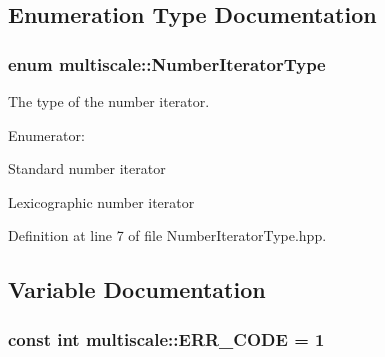 \subsection{\-Enumeration \-Type \-Documentation}
\hypertarget{namespacemultiscale_a6ef911f4d48a4bf5e657c237ec169ff5}{
\subsubsection[{\-Number\-Iterator\-Type}]{\setlength{\rightskip}{0pt plus 5cm}enum {\bf multiscale\-::\-Number\-Iterator\-Type}}}\label{namespacemultiscale_a6ef911f4d48a4bf5e657c237ec169ff5}


\-The type of the number iterator. 

\begin{Desc}
\item[\-Enumerator\-: ]\par
\begin{description}
\item[{\em 
\hypertarget{namespacemultiscale_a6ef911f4d48a4bf5e657c237ec169ff5aa048887eb0360a4b70dff5452133f42e}{\-S\-T\-A\-N\-D\-A\-R\-D}\label{namespacemultiscale_a6ef911f4d48a4bf5e657c237ec169ff5aa048887eb0360a4b70dff5452133f42e}
}]\-Standard number iterator \item[{\em 
\hypertarget{namespacemultiscale_a6ef911f4d48a4bf5e657c237ec169ff5a2cba3a0174cc5c1d555ee13dcf6cda15}{\-L\-E\-X\-I\-C\-O\-G\-R\-A\-P\-H\-I\-C}\label{namespacemultiscale_a6ef911f4d48a4bf5e657c237ec169ff5a2cba3a0174cc5c1d555ee13dcf6cda15}
}]\-Lexicographic number iterator \end{description}
\end{Desc}



\-Definition at line 7 of file \-Number\-Iterator\-Type.\-hpp.



\subsection{\-Variable \-Documentation}
\hypertarget{namespacemultiscale_a4ee40795105048ee371efeeb7962ecf6}{
\subsubsection[{\-E\-R\-R\-\_\-\-C\-O\-D\-E}]{\setlength{\rightskip}{0pt plus 5cm}const int {\bf multiscale\-::\-E\-R\-R\-\_\-\-C\-O\-D\-E} = 1}}\label{namespacemultiscale_a4ee40795105048ee371efeeb7962ecf6}


